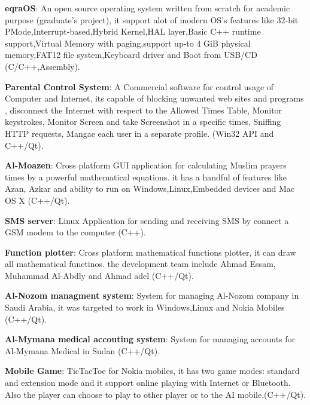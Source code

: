 \documentclass[margin,line]{resume}
\begin{document}
\begin{resume}
\textbf{eqraOS}: An open source operating system written from scratch for academic purpose (graduate's project), it support alot of modern OS’s features like 32-bit PMode,Interrupt-based,Hybrid Kernel,HAL layer,Basic C++ runtime support,Virtual Memory with paging,support up-to 4 GiB physical memory,FAT12 file system,Keyboard driver and Boot from USB/CD (C/C++,Assembly).
\vspace{-2mm}

\textbf{Parental Control System}: A Commercial software for control usage of Computer and Internet, its capable of blocking unwanted web sites and programs , disconnect the Internet with respect to the Allowed Times Table, Monitor keystrokes, Monitor Screen and take Screenshot in a specific times, Sniffing HTTP requests, Mangae each user in a separate profile. (Win32 API and C++/Qt). 
\vspace{-2mm}

\textbf{Al-Moazen}: Cross platform GUI application for calculating Muslim prayers times by a powerful mathematical equations. it has a handful of features like Azan, Azkar and ability to run on Windows,Linux,Embedded devices and Mac OS X (C++/Qt).
\vspace{-2mm}


\textbf{SMS server}: Linux Application for sending and receiving SMS by connect a GSM modem to the computer (C++).
\vspace{-2mm}

\textbf{Function plotter}: Cross platform mathematical functions plotter, it can draw all mathematical functinos. the development team include Ahmad Essam, Muhammad Al-Abdly and Ahmad adel (C++/Qt).
\vspace{-2mm}

\textbf{Al-Nozom managment system}: System for managing Al-Nozom company in Saudi Arabia, it was targeted to work in Windows,Linux and Nokia Mobiles (C++/Qt).
\vspace{-2mm}

\textbf{Al-Mymana medical accouting system}: System for managing accounts for Al-Mymana Medical in Sudan (C++/Qt).
\vspace{-2mm}

\textbf{Mobile Game}: TicTacToe for Nokia mobiles, it has two game modes: standard and extension mode and it support online playing with Internet or Bluetooth. Also the player can choose to play to other player or to the AI mobile.(C++/Qt).
\vspace{-2mm}

\vspace{-2mm}



\end{resume}
\end{document}
